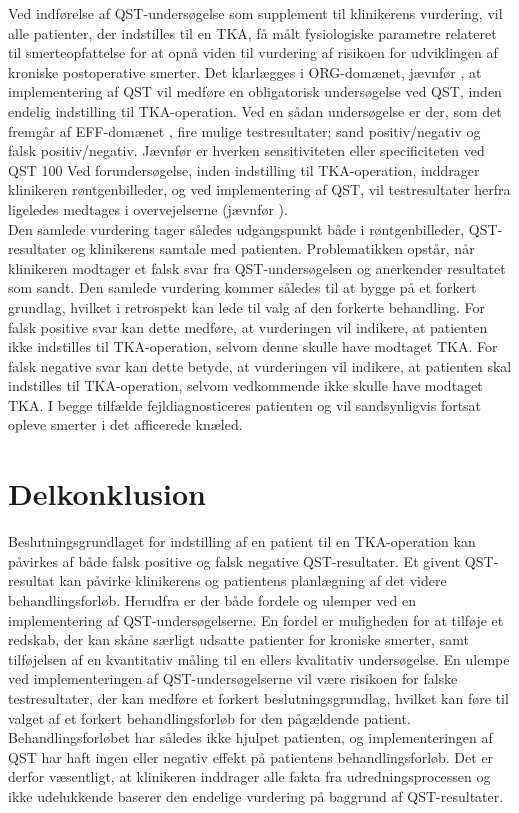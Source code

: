 Ved indførelse af QST-undersøgelse som supplement til klinikerens vurdering, vil alle patienter, der indstilles til en TKA, få målt fysiologiske parametre relateret til smerteopfattelse for at opnå viden til vurdering af risikoen for udviklingen af kroniske postoperative smerter. 
Det klarlægges i ORG-domænet, jævnfør , at implementering af QST vil medføre en obligatorisk undersøgelse ved QST, inden endelig indstilling til TKA-operation. Ved en sådan undersøgelse er der, som det fremgår af EFF-domænet , fire mulige testresultater; sand positiv/negativ og falsk positiv/negativ. Jævnfør  er hverken sensitiviteten eller specificiteten ved QST 100%
Ved forundersøgelse, inden indstilling til TKA-operation, inddrager klinikeren røntgenbilleder, og ved implementering af QST, vil testresultater herfra ligeledes medtages i overvejelserne (jævnfør ). \\
Den samlede vurdering tager således udgangspunkt både i røntgenbilleder, QST-resultater og klinikerens samtale med patienten. Problematikken opstår, når klinikeren modtager et falsk svar fra QST-undersøgelsen og anerkender resultatet som sandt. Den samlede vurdering kommer således til at bygge på et forkert grundlag, hvilket i retrospekt kan lede til valg af den forkerte behandling. 
For falsk positive svar kan dette medføre, at vurderingen vil indikere, at patienten ikke indstilles til TKA-operation, selvom denne skulle have modtaget TKA.
For falsk negative svar kan dette betyde, at vurderingen vil indikere, at patienten skal indstilles til TKA-operation, selvom vedkommende ikke skulle have modtaget TKA.
I begge tilfælde fejldiagnosticeres patienten og vil sandsynligvis fortsat opleve smerter i det afficerede knæled.


\section{Delkonklusion}
Beslutningsgrundlaget for indstilling af en patient til en TKA-operation kan påvirkes af både falsk positive og falsk negative QST-resultater. Et givent QST-resultat kan påvirke klinikerens og patientens planlægning af det videre behandlingsforløb. Herudfra er der både fordele og ulemper ved en implementering af QST-undersøgelserne. En fordel er muligheden for at tilføje et redskab, der kan skåne særligt udsatte patienter for kroniske smerter, samt tilføjelsen af en kvantitativ måling til en ellers kvalitativ undersøgelse. En ulempe ved implementeringen af QST-undersøgelserne vil være risikoen for falske testresultater, der kan medføre et forkert beslutningsgrundlag, hvilket kan føre til valget af et forkert behandlingsforløb for den pågældende patient. Behandlingsforløbet har således ikke hjulpet patienten, og implementeringen af QST har haft ingen eller negativ effekt på patientens behandlingsforløb. Det er derfor væsentligt, at klinikeren inddrager alle fakta fra udredningsprocessen og ikke udelukkende baserer den endelige vurdering på baggrund af QST-resultater.